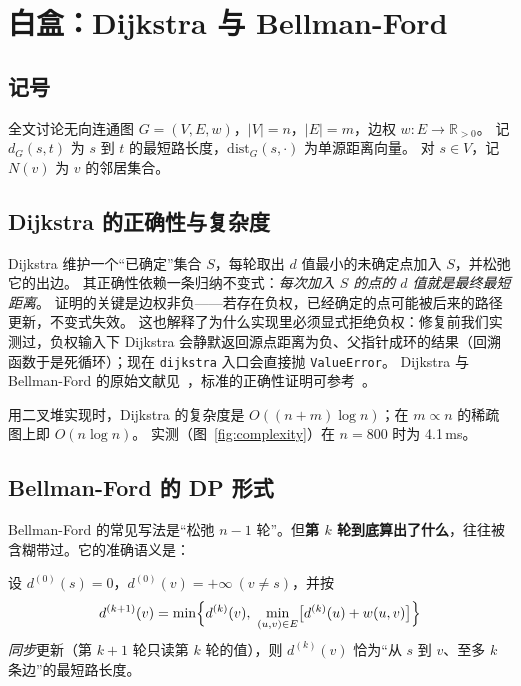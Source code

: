 ﻿\section{白盒：Dijkstra 与 Bellman-Ford}\label{sec:white}

\subsection{记号}

全文讨论无向连通图 $G=(V,E,w)$，$|V|=n$，$|E|=m$，边权 $w:E\to\mathbb{R}_{>0}$。
记 $d_G(s,t)$ 为 $s$ 到 $t$ 的最短路长度，$\mathrm{dist}_G(s,\cdot)$ 为单源距离向量。
对 $s\in V$，记 $N(v)$ 为 $v$ 的邻居集合。

\subsection{Dijkstra 的正确性与复杂度}

Dijkstra 维护一个“已确定”集合 $S$，每轮取出 $d$ 值最小的未确定点加入 $S$，并松弛它的出边。
其正确性依赖一条归纳不变式：\emph{每次加入 $S$ 的点的 $d$ 值就是最终最短距离}。
证明的关键是边权非负——若存在负权，已经确定的点可能被后来的路径更新，不变式失效。
这也解释了为什么实现里必须显式拒绝负权：修复前我们实测过，负权输入下 Dijkstra 会静默返回源点距离为负、父指针成环的结果（回溯函数于是死循环）；现在 \texttt{dijkstra} 入口会直接抛 \texttt{ValueError}。
Dijkstra 与 Bellman-Ford 的原始文献见~\cite{dijkstra1959,bellman1958}，标准的正确性证明可参考~\cite{cormen2009clrs}。

用二叉堆实现时，Dijkstra 的复杂度是 $O((n+m)\log n)$；在 $m\propto n$ 的稀疏图上即 $O(n\log n)$。
实测（图~\ref{fig:complexity}）在 $n=800$ 时为 4.1\,ms。

\subsection{Bellman-Ford 的 DP 形式}\label{sec:bf}

Bellman-Ford 的常见写法是“松弛 $n-1$ 轮”。但\textbf{第 $k$ 轮到底算出了什么}，往往被含糊带过。它的准确语义是：

\begin{proposition}[轮数语义]\label{prop:rounds}
设 $d^{(0)}(s)=0$，$d^{(0)}(v)=+\infty\ (v\ne s)$，并按
\begin{equation}
d^{(k+1)}(v)=\min\Bigl\{d^{(k)}(v),\ \min_{(u,v)\in E}\bigl[d^{(k)}(u)+w(u,v)\bigr]\Bigr\}
\label{eq:bf}
\end{equation}
\emph{同步}更新（第 $k+1$ 轮只读第 $k$ 轮的值），则 $d^{(k)}(v)$ 恰为“从 $s$ 到 $v$、至多 $k$ 条边”的最短路长度。
\end{proposition}

